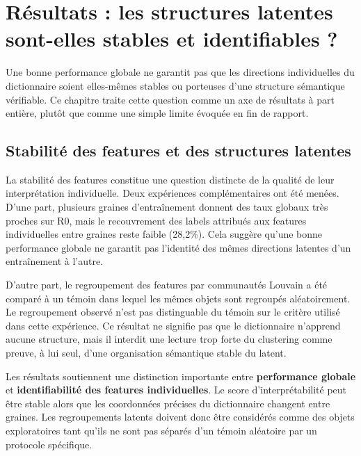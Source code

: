 \documentclass[11pt]{article}
\begin{document}
\newpage
\section{Résultats : les structures latentes sont-elles stables et identifiables ?}
\label{sec:resultats-stabilite}

Une bonne performance globale ne garantit pas que les directions
individuelles du dictionnaire soient elles-mêmes stables ou porteuses d'une
structure sémantique vérifiable. Ce chapitre traite cette question comme un
axe de résultats à part entière, plutôt que comme une simple limite évoquée
en fin de rapport.

\subsection{Stabilité des features et des structures latentes}
\label{subsec:reproductibilite}

La stabilité des features constitue une question distincte de la qualité de leur
interprétation individuelle. Deux expériences complémentaires ont été menées. D'une
part, plusieurs graines d'entraînement donnent des taux globaux très proches sur R0,
mais le recouvrement des labels attribués aux features individuelles entre graines
reste faible (28,2\%). Cela suggère qu'une bonne performance globale ne garantit pas
l'identité des mêmes directions latentes d'un entraînement à l'autre.

D'autre part, le regroupement des features par communautés Louvain a été comparé à un
témoin dans lequel les mêmes objets sont regroupés aléatoirement. Le regroupement
observé n'est pas distinguable du témoin sur le critère utilisé dans cette expérience.
Ce résultat ne signifie pas que le dictionnaire n'apprend aucune structure, mais il
interdit une lecture trop forte du clustering comme preuve, à lui seul, d'une
organisation sémantique stable du latent.

\begin{resultbox}
Les résultats soutiennent une distinction importante entre \textbf{performance globale}
et \textbf{identifiabilité des features individuelles}. Le score d'interprétabilité peut
être stable alors que les coordonnées précises du dictionnaire changent entre graines.
Les regroupements latents doivent donc être considérés comme des objets exploratoires
tant qu'ils ne sont pas séparés d'un témoin aléatoire par un protocole spécifique.
\end{resultbox}
\end{document}
